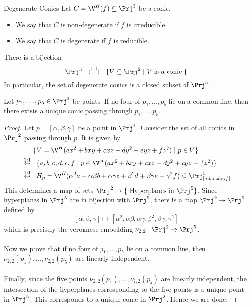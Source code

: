 \documentclass[a4paper]{article}
\begin{document}
\begin{defn}{Degenerate Conics}{} Let $C=\V^H(f)\subseteq\Prj^2$ be a conic. 
\begin{itemize}
\item We say that $C$ is non-degenerate if $f$ is irreducible. 
\item We say that $C$ is degenerate if $f$ is reducible. 
\end{itemize}
\end{defn}

\begin{lmm}{}{} There is a bijection $$\Prj^5\;\;\overset{1:1}{\longleftrightarrow}\;\;\{V\subseteq\Prj^2\;|\;V\text{ is a conic }\}$$ In particular, the set of degenerate conics is a closed subset of $\Prj^5$. 
\end{lmm}

\begin{prp}{}{} Let $p_1,\dots,p_5\in\Prj^2$ be points. If no four of $p_1,\dots,p_5$ lie on a common line, then there exists a unique conic passing through $p_1,\dots,p_5$. \tcbline
\begin{proof}
Let $p=[\alpha,\beta,\gamma]$ be a point in $\Prj^2$. Consider the set of all conics in $\Prj^2$ passing through $p$. It is given by 
\begin{align*}
&\;\;\;\;\;\;\{V=\V^H(ax^2+bxy+cxz+dy^2+eyz+fz^2)\;|\;p\in V\}\\
&\overset{1:1}{\leftrightarrow}\;\;\{a,b,c,d,e,f\;|\;p\in\V^H(ax^2+bxy+cxz+dy^2+eyz+fz^2)\}\\
&\overset{1:1}{\leftrightarrow}\;\;H_p=\V^H(\alpha^2a+\alpha\beta b+\alpha\gamma c+\beta^2d+\beta\gamma e+\gamma^2f)\subseteq\Prj_{[a:b:c:d:e:f]}^5
\end{align*}
This determines a map of sets $\Prj^2\to\{\text{ Hyperplanes in }\Prj^5\}$. Since hyperplanes in $\Prj^5$ are in bijection with $\Prj^5$, there is a map $\Prj^2\to\Prj^5$ defined by $$[\alpha,\beta,\gamma]\mapsto[\alpha^2,\alpha\beta,\alpha\gamma,\beta^2,\beta\gamma,\gamma^2]$$ which is precisely the veronnese embedding $\nu_{2,2}:\Prj^2\to\Prj^5$. \\~\\

Now we prove that if no four of $p_1,\dots,p_5$ lie on a common line, then $\nu_{2,2}(p_1),\dots,\nu_{2,2}(p_5)$ are linearly independent. \\~\\

Finally, since the five points $\nu_{2,2}(p_1),\dots,\nu_{2,2}(p_5)$ are linearly independent, the intersection of the hyperplanes corresponding to the five points is a unique point in $\Prj^5$. This corresponds to a unique conic in $\Prj^2$. Hence we are done. 
\end{proof}
\end{prp}
\end{document}
